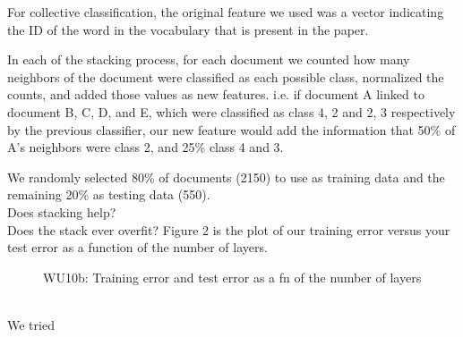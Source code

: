 \documentclass[a4paper,11pt]{article}
\begin{document}
For collective classification, the original feature we used was a
vector indicating the ID of the word in the vocabulary that is present
in the paper.

In each of the stacking process, for each document we counted how many
neighbors of the document were classified as each possible class,
normalized the counts, and added those values as new features. i.e. if
document A linked to document B, C, D, and E, which were classified as
class 4, 2 and 2, 3 respectively by the previous classifier, our new feature would add the
information that 50\% of A's neighbors were class 2, and 25\% class 4
and 3. 

We randomly selected 80\% of documents (2150) to use as training data
and the remaining 20\% as testing data (550).\\


Does stacking help?\\


Does the stack ever overfit? Figure 2 is the plot of our training
error versus your test error as a function of the number of layers.
\begin{figure}[h!]
  \caption{WU10b: Training error and test error as a fn of the number of layers }
  \centering
\end{figure}\\

We tried
\end{document}
